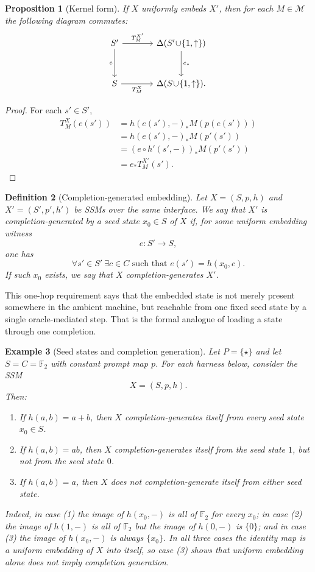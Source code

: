 \documentclass[11pt]{article}
\newtheorem{definition}{Definition}[section]
\newtheorem{proposition}[definition]{Proposition}
\newtheorem{example}[definition]{Example}
\begin{document}
\begin{proposition}[Kernel form]\label{prop:kernel-form}
If $X$ uniformly embeds $X'$, then for each $M\in\mathcal{M}$ the following diagram commutes:
\[
\begin{tikzcd}[column sep=3.6em,row sep=3.0em]
S' \arrow[r,"T_M^{X'}"] \arrow[d,"e"'] & \Delta(S'\!\cup\!\{1,\uparrow\}) \arrow[d,"e_*"] \\
S \arrow[r,"T_M^{X}"'] & \Delta(S\!\cup\!\{1,\uparrow\}).
\end{tikzcd}
\]
\end{proposition}

\begin{proof}
For each $s'\in S'$,
\begin{align*}
T_M^X(e(s'))
&=h(e(s'),-)_{*}M(p(e(s')))\\
&=h(e(s'),-)_{*}M(p'(s'))\\
&=(e\circ h'(s',-))_*M(p'(s'))\\
&=e_*T_M^{X'}(s').
\end{align*}
\end{proof}

\begin{definition}[Completion-generated embedding]
Let $X=(S,p,h)$ and $X'=(S',p',h')$ be SSMs over the same interface. We say that $X'$ is \emph{completion-generated by a seed state $x_0\in S$ of $X$} if, for some uniform embedding witness
\[
e:S'\to S,
\]
one has
\[
\forall s'\in S'\ \exists c\in C\text{ such that } e(s')=h(x_0,c).
\]
If such $x_0$ exists, we say that $X$ \emph{completion-generates} $X'$.
\end{definition}

This one-hop requirement says that the embedded state is not merely present somewhere in the ambient machine, but reachable from one fixed seed state by a single oracle-mediated step. That is the formal analogue of loading a state through one completion.

\begin{example}[Seed states and completion generation]\label{ex:seeds}
Let $P=\{\star\}$ and let $S=C=\mathbb{F}_2$ with constant prompt map $p$. For each harness below, consider the SSM
\[
X=(S,p,h).
\]
Then:
\begin{enumerate}[label=(\arabic*)]
    \item If $h(a,b)=a+b$, then $X$ completion-generates itself from every seed state $x_0\in S$.
    \item If $h(a,b)=ab$, then $X$ completion-generates itself from the seed state $1$, but not from the seed state $0$.
    \item If $h(a,b)=a$, then $X$ does not completion-generate itself from either seed state.
\end{enumerate}
Indeed, in case (1) the image of $h(x_0,-)$ is all of $\mathbb{F}_2$ for every $x_0$; in case (2) the image of $h(1,-)$ is all of $\mathbb{F}_2$ but the image of $h(0,-)$ is $\{0\}$; and in case (3) the image of $h(x_0,-)$ is always $\{x_0\}$. In all three cases the identity map is a uniform embedding of $X$ into itself, so case (3) shows that uniform embedding alone does not imply completion generation.
\end{example}
\end{document}
